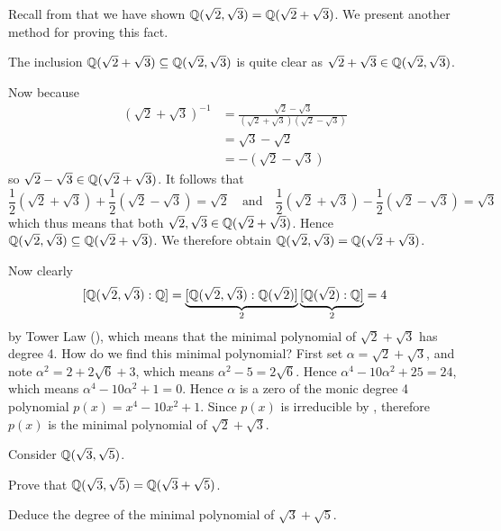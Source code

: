 \begin{example}
    Recall from  that we have shown $\mathbb{Q}(\sqrt2, \sqrt3) = \mathbb{Q}(\sqrt2 + \sqrt3)$. We present another method for proving this fact.

    The inclusion $\mathbb{Q}(\sqrt2 + \sqrt3) \subseteq \mathbb{Q}(\sqrt2, \sqrt3)$ is quite clear as $\sqrt2 + \sqrt3 \in \mathbb{Q}(\sqrt2, \sqrt3)$.

    Now because
    \begin{align*}
        \left(\sqrt2 + \sqrt3\right)^{-1} &= \frac{\sqrt2-\sqrt3}{(\sqrt2+\sqrt3)(\sqrt2-\sqrt3)}\\
        &= \sqrt3-\sqrt2\\
        &= -(\sqrt2 - \sqrt3)
    \end{align*}
    so $\sqrt2 - \sqrt3 \in \mathbb{Q}(\sqrt2 + \sqrt3)$. It follows that
    \[
        \frac12\left(\sqrt2 + \sqrt3\right) + \frac12\left(\sqrt2 - \sqrt3\right) = \sqrt2 \quad\text{and}\quad \frac12\left(\sqrt2 + \sqrt3\right) - \frac12\left(\sqrt2 - \sqrt3\right) = \sqrt3
    \]
    which thus means that both $\sqrt2, \sqrt3 \in \mathbb{Q}(\sqrt2+\sqrt3)$. Hence $\mathbb{Q}(\sqrt2, \sqrt3) \subseteq \mathbb{Q}(\sqrt2 + \sqrt3)$. We therefore obtain $\mathbb{Q}(\sqrt2, \sqrt3) = \mathbb{Q}(\sqrt2+\sqrt3)$.

    Now clearly
    \[
        [\mathbb{Q}(\sqrt2, \sqrt3): \mathbb{Q}] = \underbrace{[\mathbb{Q}(\sqrt2, \sqrt3): \mathbb{Q}(\sqrt2)]}_2\underbrace{[\mathbb{Q}(\sqrt2):\mathbb{Q}]}_2 = 4
    \]
    by Tower Law (), which means that the minimal polynomial of $\sqrt2+\sqrt3$ has degree 4. How do we find this minimal polynomial? First set $\alpha = \sqrt2 + \sqrt3$, and note $\alpha^2 = 2 + 2\sqrt6 + 3$, which means $\alpha^2 - 5 = 2\sqrt6$. Hence $\alpha^4 - 10\alpha^2 + 25 = 24$, which means $\alpha^4 - 10\alpha^2 + 1 = 0$. Hence $\alpha$ is a zero of the monic degree 4 polynomial $p(x) = x^4 - 10x^2 + 1$. Since $p(x)$ is irreducible by , therefore $p(x)$ is the minimal polynomial of $\sqrt2 + \sqrt3$.
\end{example}

\begin{exercise}\label{exercise-Q-sqrt3-sqrt5}
    Consider $\mathbb{Q}(\sqrt3,\sqrt5)$.
    \begin{partquestions}{\roman*}
        \item Prove that $\mathbb{Q}(\sqrt3,\sqrt5) = \mathbb{Q}(\sqrt3+\sqrt5)$.
        \item Deduce the degree of the minimal polynomial of $\sqrt3+\sqrt5$.
    \end{partquestions}
\end{exercise}

